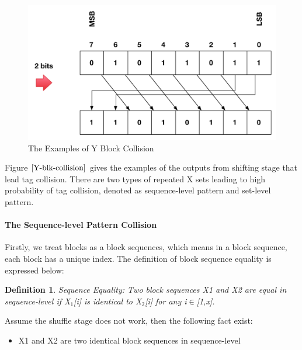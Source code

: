 \documentclass{article}
\newtheorem{defination}{Definition}[section]
\begin{document}
\begin{figure}
{\begin{minipage}[b]{0.45\textwidth}
\includegraphics[width=1\textwidth]{./diagrams/r_d_2bits.pdf}
\end{minipage}
}
 \caption{The Examples of Y Block Collision}
 \label{fig: Y-blk-collision}
\end{figure}
Figure $\ref{Y-blk-collision}$ gives the examples of the outputs from shifting
stage that lead tag collision. There are two types of repeated X sets leading to
high probability of tag collision, denoted as sequence-level pattern and
set-level pattern.

\paragraph{The Sequence-level Pattern Collision}
Firstly, we treat blocks as a block sequences, which means in a block sequence, each block has a unique index. The definition of block sequence equality is expressed below:
\begin{defination}
Sequence Equality: Two block sequences X1 and X2 are equal in sequence-level if X$_1$[i] is identical to X$_2$[i] for any i$\in$[1,x].
\end{defination}

Assume the shuffle stage does not work, then the following fact exist:
\begin{itemize}
	\item X1 and X2 are two identical block sequences in sequence-level
\end{itemize}
\end{document}
